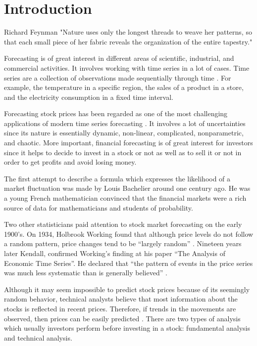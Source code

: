\chapter{Introduction}
\label{ch:introsm}
\begin{chapterquote}{Richard Feynman}
"Nature uses only the longest threads to weave her patterns, so
that each small piece of her fabric reveals the organization of
the entire tapestry."
\end{chapterquote}
Forecasting is of great interest in different areas of scientific, industrial, and commercial activities. It involves working with time series in a lot of cases. Time series are a collection of observations made sequentially through time \cite{chatfield2000time}. For example, the temperature in a specific region, the sales of a product in a store, and the electricity consumption in a fixed time interval.

Forecasting stock prices has been regarded as one of the most challenging applications of modern time series forecasting \cite{pai2005hybrid}. It involves a lot of uncertainties since its nature is essentially dynamic, non-linear, complicated, nonparametric, and chaotic. More important, financial forecasting is of great interest for investors since it helps to decide to invest in a stock or not as well as to sell it or not in order to get profits and avoid losing money.

The first attempt to describe a formula which expresses the likelihood of a market fluctuation was made by Louis Bachelier around one century ago. He was a young French mathematician convinced that the financial markets were a rich source of data for mathematicians and students of probability. 

Two other statisticians paid attention to stock market forecasting on the early 1900's. On 1934,  Holbrook Working found that although price levels do not follow a random pattern, price changes tend to be “largely random” \cite{bernstein1993capital}. Nineteen years later Kendall, confirmed Working's finding at his paper “The Analysis of Economic Time Series”. He declared that “the pattern of events in the price series was much less systematic than is generally believed” \cite{bernstein1993capital}. 

Although it may seem impossible to predict stock prices because of its seemingly random behavior, technical analysts believe that most information about the stocks is reflected in recent prices. Therefore, if trends in the movements are observed, then prices can be easily predicted \cite{patel2015predicting}. There are two types of analysis which usually investors perform before investing in a stock: fundamental analysis and technical analysis.

